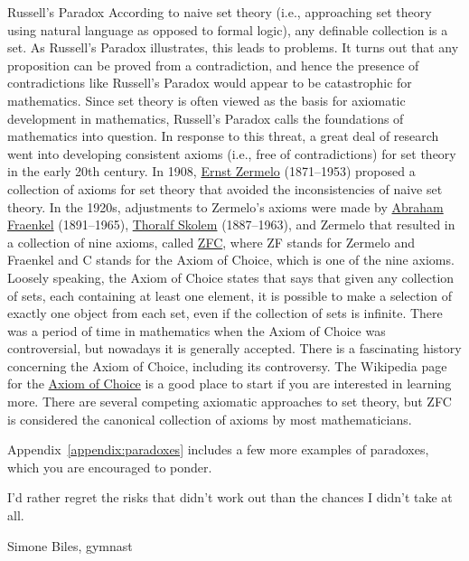 \begin{section}{Russell's Paradox}
According to naive set theory (i.e., approaching set theory using natural language as opposed to formal logic), any definable collection is a set. As Russell's Paradox illustrates, this leads to problems.  It turns out that any proposition can be proved from a contradiction, and hence the presence of contradictions like Russell's Paradox would appear to be catastrophic for mathematics.  Since set theory is often viewed as the basis for axiomatic development in mathematics, Russell's Paradox calls the foundations of mathematics into question. In response to this threat, a great deal of research went into developing consistent axioms (i.e., free of contradictions) for set theory in the early 20th century. In 1908, \href{https://en.wikipedia.org/wiki/Ernst_Zermelo}{Ernst Zermelo} (1871--1953) proposed a collection of axioms for set theory that avoided the inconsistencies of naive set theory. In the 1920s, adjustments to Zermelo's axioms were made by \href{https://en.wikipedia.org/wiki/Abraham_Fraenkel}{Abraham Fraenkel} (1891--1965), \href{https://en.wikipedia.org/wiki/Thoralf_Skolem}{Thoralf Skolem} (1887--1963), and Zermelo that resulted in a collection of nine axioms, called \href{https://en.wikipedia.org/wiki/Zermelo-Fraenkel_set_theory}{ZFC}, where ZF stands for Zermelo and Fraenkel and C stands for the Axiom of Choice, which is one of the nine axioms. Loosely speaking, the Axiom of Choice states that says that given any collection of sets, each containing at least one element, it is possible to make a selection of exactly one object from each set, even if the collection of sets is infinite. There was a period of time in mathematics when the Axiom of Choice was controversial, but nowadays it is generally accepted.  There is a fascinating history concerning the Axiom of Choice, including its controversy.  The Wikipedia page for the \href{https://en.wikipedia.org/wiki/Axiom_of_choice}{Axiom of Choice} is a good place to start if you are interested in learning more. There are several competing axiomatic approaches to set theory, but ZFC is considered the canonical collection of axioms by most mathematicians.

Appendix~\ref{appendix:paradoxes} includes a few more examples of paradoxes, which you are encouraged to ponder.

\epigraph{I'd rather regret the risks that didn't work out than the chances I didn't take at all.}{Simone Biles, gymnast}
\end{section}